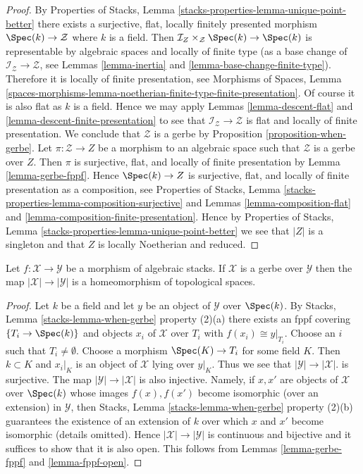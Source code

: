 \begin{proof}
By
Properties of Stacks, Lemma \ref{stacks-properties-lemma-unique-point-better}
there exists a surjective, flat, locally finitely presented morphism
$\Spec(k) \to \mathcal{Z}$ where $k$ is a field.
Then $\mathcal{I}_Z \times_\mathcal{Z} \Spec(k) \to \Spec(k)$
is representable by algebraic spaces and
locally of finite type (as a base change of
$\mathcal{I}_\mathcal{Z} \to \mathcal{Z}$, see
Lemmas \ref{lemma-inertia} and \ref{lemma-base-change-finite-type}).
Therefore it is locally of finite presentation, see
Morphisms of Spaces, Lemma
\ref{spaces-morphisms-lemma-noetherian-finite-type-finite-presentation}.
Of course it is also flat as $k$ is a field. Hence we may apply
Lemmas \ref{lemma-descent-flat} and
\ref{lemma-descent-finite-presentation}
to see that $\mathcal{I}_\mathcal{Z} \to \mathcal{Z}$ is flat and
locally of finite presentation. We conclude that $\mathcal{Z}$
is a gerbe by
Proposition \ref{proposition-when-gerbe}.
Let $\pi : \mathcal{Z} \to Z$ be a morphism to an algebraic space such
that $\mathcal{Z}$ is a gerbe over $Z$. Then $\pi$ is surjective, flat, and
locally of finite presentation by
Lemma \ref{lemma-gerbe-fppf}.
Hence $\Spec(k) \to Z$ is surjective, flat, and locally of finite
presentation as a composition, see
Properties of Stacks,
Lemma \ref{stacks-properties-lemma-composition-surjective}
and
Lemmas \ref{lemma-composition-flat} and
\ref{lemma-composition-finite-presentation}.
Hence by
Properties of Stacks, Lemma \ref{stacks-properties-lemma-unique-point-better}
we see that $|Z|$ is a singleton and that $Z$ is locally Noetherian
and reduced.
\end{proof}

\begin{lemma}
\label{lemma-gerbe-bijection-points}
Let $f : \mathcal{X} \to \mathcal{Y}$ be a morphism of algebraic stacks.
If $\mathcal{X}$ is a gerbe over $\mathcal{Y}$ then the map
$|\mathcal{X}| \to |\mathcal{Y}|$ is a homeomorphism of topological spaces.
\end{lemma}

\begin{proof}
Let $k$ be a field and let $y$ be an object
of $\mathcal{Y}$ over $\Spec(k)$. By
Stacks, Lemma \ref{stacks-lemma-when-gerbe} property (2)(a)
there exists an fppf covering $\{T_i \to \Spec(k)\}$
and objects $x_i$ of $\mathcal{X}$ over $T_i$ with $f(x_i) \cong y|_{T_i}$.
Choose an $i$ such that $T_i \not = \emptyset$. Choose a
morphism $\Spec(K) \to T_i$ for some field $K$.
Then $k \subset K$ and $x_i|_K$ is an object of $\mathcal{X}$ lying
over $y|_K$. Thus we see that
$|\mathcal{Y}| \to |\mathcal{X}|$. is surjective. The map
$|\mathcal{Y}| \to |\mathcal{X}|$ is also injective. Namely, if
$x, x'$ are objects of $\mathcal{X}$ over $\Spec(k)$ whose images
$f(x), f(x')$ become isomorphic (over an extension) in $\mathcal{Y}$, then
Stacks, Lemma \ref{stacks-lemma-when-gerbe} property (2)(b)
guarantees the existence of an extension of $k$ over which $x$ and $x'$
become isomorphic (details omitted).
Hence $|\mathcal{X}| \to |\mathcal{Y}|$ is continuous and bijective
and it suffices to show that it is also open.
This follows from
Lemmas \ref{lemma-gerbe-fppf} and \ref{lemma-fppf-open}.
\end{proof}

